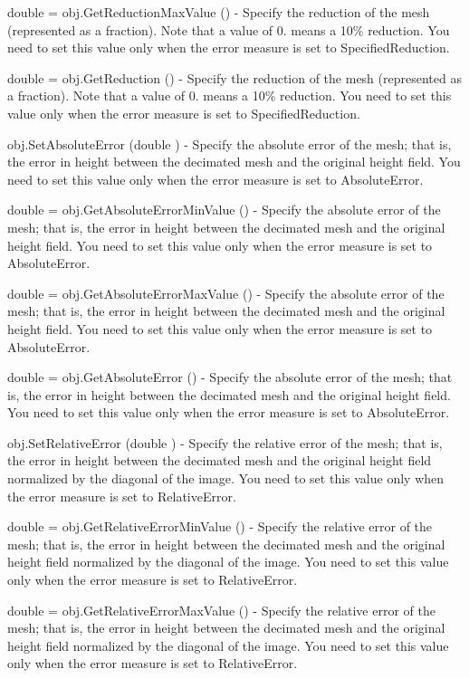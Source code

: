 \begin{DoxyItemize}
\item {\ttfamily double = obj.\-Get\-Reduction\-Max\-Value ()} -\/ Specify the reduction of the mesh (represented as a fraction). Note that a value of 0. means a 10\% reduction. You need to set this value only when the error measure is set to Specified\-Reduction.  
\item {\ttfamily double = obj.\-Get\-Reduction ()} -\/ Specify the reduction of the mesh (represented as a fraction). Note that a value of 0. means a 10\% reduction. You need to set this value only when the error measure is set to Specified\-Reduction.  
\item {\ttfamily obj.\-Set\-Absolute\-Error (double )} -\/ Specify the absolute error of the mesh; that is, the error in height between the decimated mesh and the original height field. You need to set this value only when the error measure is set to Absolute\-Error.  
\item {\ttfamily double = obj.\-Get\-Absolute\-Error\-Min\-Value ()} -\/ Specify the absolute error of the mesh; that is, the error in height between the decimated mesh and the original height field. You need to set this value only when the error measure is set to Absolute\-Error.  
\item {\ttfamily double = obj.\-Get\-Absolute\-Error\-Max\-Value ()} -\/ Specify the absolute error of the mesh; that is, the error in height between the decimated mesh and the original height field. You need to set this value only when the error measure is set to Absolute\-Error.  
\item {\ttfamily double = obj.\-Get\-Absolute\-Error ()} -\/ Specify the absolute error of the mesh; that is, the error in height between the decimated mesh and the original height field. You need to set this value only when the error measure is set to Absolute\-Error.  
\item {\ttfamily obj.\-Set\-Relative\-Error (double )} -\/ Specify the relative error of the mesh; that is, the error in height between the decimated mesh and the original height field normalized by the diagonal of the image. You need to set this value only when the error measure is set to Relative\-Error.  
\item {\ttfamily double = obj.\-Get\-Relative\-Error\-Min\-Value ()} -\/ Specify the relative error of the mesh; that is, the error in height between the decimated mesh and the original height field normalized by the diagonal of the image. You need to set this value only when the error measure is set to Relative\-Error.  
\item {\ttfamily double = obj.\-Get\-Relative\-Error\-Max\-Value ()} -\/ Specify the relative error of the mesh; that is, the error in height between the decimated mesh and the original height field normalized by the diagonal of the image. You need to set this value only when the error measure is set to Relative\-Error.  

\end{DoxyItemize}
